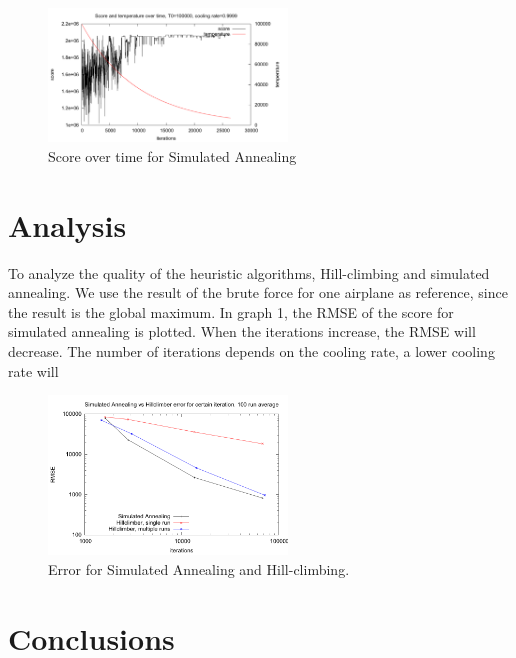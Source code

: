 \documentclass[journal]{IEEEtran}
\begin{document}
\\
\begin{figure}[!h]
\centering
\includegraphics[width=2.5in]{score_over_time}
\caption{Score over time for Simulated Annealing}
\label{fig:simulated_annealing_score}
\end{figure}
\section{Analysis}
To analyze the quality of the heuristic algorithms, Hill-climbing and simulated annealing. We use the result of the brute force for one airplane as reference, since the result is the global maximum. In graph 1, the RMSE of the score for simulated annealing is plotted. When the iterations increase, the RMSE will decrease. The number of iterations depends on the cooling rate, a lower cooling rate will 
\begin{figure}[!h]
\centering
\includegraphics[width=2.5in]{iterations_vs_error_sa_hc}
\caption{Error for Simulated Annealing and Hill-climbing.}
\label{fig:error_sa_hc}
\end{figure}
\section{Conclusions}


\end{document}
